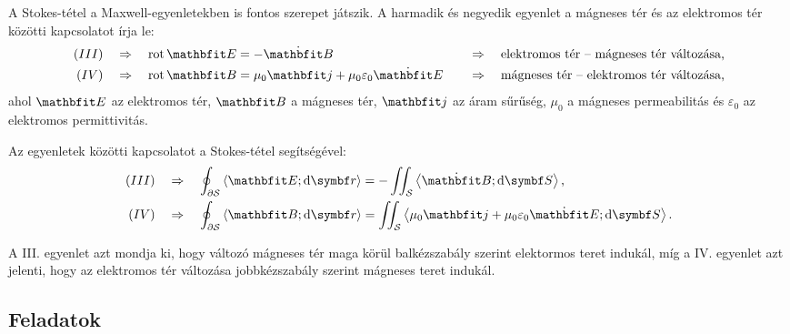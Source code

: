 \documentclass{szb-practice}
\begin{document}
\begin{learnMore}
  A Stokes-tétel a Maxwell-egyenletekben is fontos szerepet játszik. A harmadik
  és negyedik egyenlet a mágneses tér és az elektromos tér közötti
  kapcsolatot írja le:
  $$
    \begin{aligned}
      (III) & \quad \Rightarrow \quad \rot \rvec E = -\dot{\rvec B}
            &
            & \quad \Rightarrow \quad \text{elektromos tér -- mágneses tér változása,}
      \\
      (IV)  & \quad \Rightarrow \quad \rot \rvec B = \mu_0 \rvec j + \mu_0
      \varepsilon_0 \dot{\rvec E}
            &
            & \quad \Rightarrow \quad \text{mágneses tér -- elektromos tér változása,}
    \end{aligned}
  $$
  ahol $\rvec E$ az elektromos tér, $\rvec B$ a mágneses tér, $\rvec j$ az áram
  sűrűség, $\mu_0$ a mágneses permeabilitás és $\varepsilon_0$ az elektromos
  permittivitás.

  Az egyenletek közötti kapcsolatot a Stokes-tétel segítségével:
  $$
    \begin{aligned}
      (III) & \quad \Rightarrow \quad
      \oint_{\partial \surfimage} \scalar{\rvec E}{\dd \curvevec}
      = -\iint_{\surfimage} \scalar{\dot{\rvec B}}{\dd \surfvec}
      \text,
      \\
      (IV)  & \quad \Rightarrow \quad
      \oint_{\partial \surfimage} \scalar{\rvec B}{\dd \curvevec}
      = \iint_{\surfimage} \scalar{\mu_0 \rvec j + \mu_0 \varepsilon_0 \dot{\rvec E}}{\dd \surfvec}
      \text.
    \end{aligned}
  $$

  A III. egyenlet azt mondja ki, hogy változó mágneses tér maga körül
  balkézszabály szerint elektormos teret indukál, míg a IV. egyenlet azt
  jelenti, hogy az elektromos tér változása jobbkézszabály szerint
  mágneses teret indukál.
\end{learnMore}

\clearpage
\subsection{Feladatok}
\end{document}
